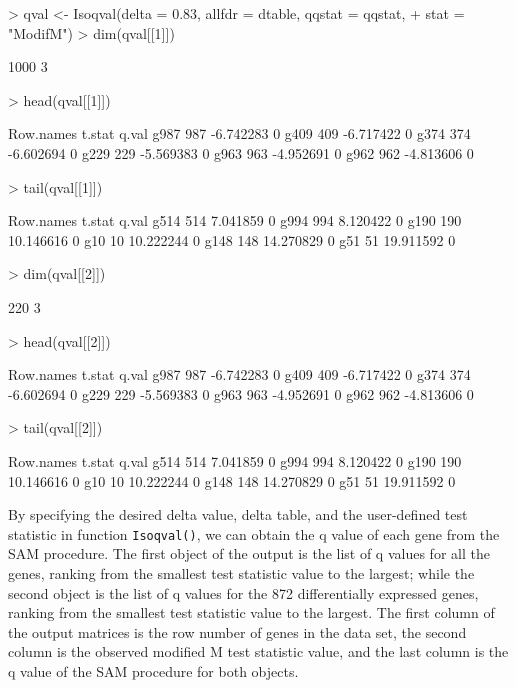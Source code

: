 \documentclass[10pt]{mybook4}
\begin{document}
\begin{Schunk}
\begin{Sinput}
> qval <- Isoqval(delta = 0.83, allfdr = dtable, qqstat = qqstat, 
+     stat = "ModifM")
> dim(qval[[1]])
\end{Sinput}
\begin{Soutput}
[1] 1000    3
\end{Soutput}
\begin{Sinput}
> head(qval[[1]])
\end{Sinput}
\begin{Soutput}
     Row.names    t.stat q.val
g987       987 -6.742283     0
g409       409 -6.717422     0
g374       374 -6.602694     0
g229       229 -5.569383     0
g963       963 -4.952691     0
g962       962 -4.813606     0
\end{Soutput}
\begin{Sinput}
> tail(qval[[1]])
\end{Sinput}
\begin{Soutput}
     Row.names    t.stat q.val
g514       514  7.041859     0
g994       994  8.120422     0
g190       190 10.146616     0
g10         10 10.222244     0
g148       148 14.270829     0
g51         51 19.911592     0
\end{Soutput}
\begin{Sinput}
> dim(qval[[2]])
\end{Sinput}
\begin{Soutput}
[1] 220   3
\end{Soutput}
\begin{Sinput}
> head(qval[[2]])
\end{Sinput}
\begin{Soutput}
     Row.names    t.stat q.val
g987       987 -6.742283     0
g409       409 -6.717422     0
g374       374 -6.602694     0
g229       229 -5.569383     0
g963       963 -4.952691     0
g962       962 -4.813606     0
\end{Soutput}
\begin{Sinput}
> tail(qval[[2]])
\end{Sinput}
\begin{Soutput}
     Row.names    t.stat q.val
g514       514  7.041859     0
g994       994  8.120422     0
g190       190 10.146616     0
g10         10 10.222244     0
g148       148 14.270829     0
g51         51 19.911592     0
\end{Soutput}
\end{Schunk}

By specifying the desired delta value, delta table, and the user-defined test statistic in function \texttt{Isoqval()}, we can obtain
the q value of each gene from the SAM procedure. The first object of the output is the list of q values for
all the genes, ranking from the smallest test statistic value to the largest; while the second object is the list of q values
for the 872 differentially expressed genes, ranking from the smallest test statistic value to the largest. The first column of the output matrices is the row number of genes in
the data set, the second column is the observed modified M test statistic value, and the last column is the q value of the
SAM procedure for both objects.
\end{document}
